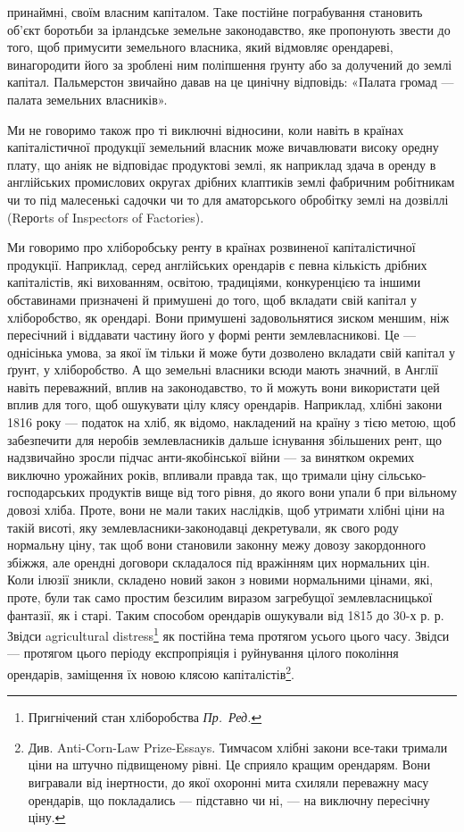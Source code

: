 \parcont{}  %
принаймні, своїм власним капіталом. Таке постійне пограбування становить об’єкт
боротьби за ірландське земельне законодавство, яке пропонують звести до того,
щоб примусити земельного власника, який відмовляє орендареві, винагородити
його за зроблені ним поліпшення ґрунту або за долучений до землі капітал.
Пальмерстон звичайно давав на це цинічну відповідь: «Палата громад — палата
земельних власників».

Ми не говоримо також про ті виключні відносини, коли навіть в країнах
капіталістичної продукції земельний власник може вичавлювати високу оредну
плату, що аніяк не відповідає продуктові землі, як наприклад здача в оренду
в англійських промислових округах дрібних клаптиків землі фабричним робітникам
чи то під малесенькі садочки чи то для аматорського обробітку землі на
дозвіллі (Rероrts of Inspectors of Factories).

Ми говоримо про хліборобську ренту в країнах розвиненої капіталістичної
продукції. Наприклад, серед англійських орендарів є певна кількість дрібних
капіталістів, які вихованням, освітою, традиціями, конкуренцією та іншими обставинами
призначені й примушені до того, щоб вкладати свій капітал у
хліборобство, як орендарі. Вони примушені задовольнятися зиском меншим,
ніж пересічний і віддавати частину його у формі ренти землевласникові. Це —
однісінька умова, за якої їм тільки й може бути дозволено вкладати свій
капітал у ґрунт, у хліборобство. А що земельні власники всюди мають значний,
в Англії навіть переважний, вплив на законодавство, то й можуть вони використати
цей вплив для того, щоб ошукувати цілу клясу орендарів. Наприклад,
хлібні закони 1816 року — податок на хліб, як відомо, накладений на
країну з тією метою, щоб забезпечити для неробів землевласників дальше існування
збільшених рент, що надзвичайно зросли підчас анти-якобінської війни —
за винятком окремих виключно урожайних років, впливали правда так, що тримали
ціну сільсько-господарських продуктів вище від того рівня, до якого вони
упали б при вільному довозі хліба. Проте, вони не мали таких наслідків, щоб
утримати хлібні ціни на такій висоті, яку землевласники-законодавці декретували,
як свого роду нормальну ціну, так щоб вони становили законну межу довозу
закордонного збіжжя, але орендні договори складалося під вражінням цих
нормальних цін. Коли ілюзії зникли, складено новий закон з новими нормальними
цінами, які, проте, були так само простим безсилим виразом загребущої
землевласницької фантазії, як і старі. Таким способом орендарів ошукували
від 1815 до 30-х р. р. Звідси agricultural distress\footnote*{
Пригнічений стан хліборобства \emph{Пр.~Ред.}
} як постійна тема протягом
усього цього часу. Звідси — протягом цього періоду експропріяція і руйнування
цілого покоління орендарів, заміщення їх новою клясою капіталістів\footnote{
Див. Anti-Corn-Law Prize-Essays. Тимчасом хлібні закони все-таки тримали ціни на штучно
підвищеному рівні. Це сприяло кращим орендарям. Вони вигравали від інертности, до якої охоронні
мита схиляли переважну масу орендарів, що покладались — підставно чи ні, — на виключну
пересічну ціну.
}.

